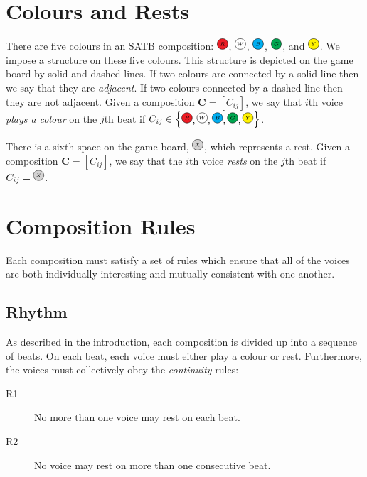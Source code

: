 \documentclass{scrartcl}
\newcommand{\RRR}{
  \begin{tikzpicture}
    \node[circle, draw, fill=Red, inner sep= 0pt, text width=1em, align=center] (n) at (0,0) {$\scriptscriptstyle R$};
  \end{tikzpicture}
}
\newcommand{\WWW}{
  \begin{tikzpicture}
    \node[circle, draw, fill=White,  inner sep= 0pt, text width=1em, align=center] (n) at (0,0) {$\scriptscriptstyle W$};
  \end{tikzpicture}
}
\newcommand{\BBB}{
  \begin{tikzpicture}
    \node[circle, draw, fill=Cyan,  inner sep= 0pt, text width=1em, align=center] (n) at (0,0) {$\scriptscriptstyle B$};
  \end{tikzpicture}
}
\newcommand{\GGG}{
  \begin{tikzpicture}
    \node[circle, draw, fill=Green,  inner sep= 0pt, text width=1em, align=center] (n) at (0,0) {$\scriptscriptstyle G$};
  \end{tikzpicture}
}
\newcommand{\YYY}{
  \begin{tikzpicture}
    \node[circle, draw, fill=Yellow,  inner sep= 0pt, text width=1em, align=center] (n) at (0,0) {$\scriptscriptstyle Y$};
  \end{tikzpicture}
}
\newcommand{\XXX}{
  \begin{tikzpicture}
    \node[circle, draw, fill=Gray!40,  inner sep= 0pt, text width=1em, align=center] (n) at (0,0) {$\scriptscriptstyle X$};
  \end{tikzpicture}
}
\numberwithin{example}{section}
\begin{document}
\section{Colours and Rests}
There are five colours in an SATB composition:
$\RRR$, $\WWW$, $\BBB$, $\GGG$, and $\YYY$.
We impose a structure on these five colours. This structure is depicted on the game
board by solid and dashed lines. 
If two colours are connected by a solid line then we say that they are \emph{adjacent}.
If two colours connected by a dashed line then they are not adjacent.
Given a composition $\mathbf{C} = [C_{ij}]$, we say that $i$th voice
\emph{plays a colour} on the $j$th beat if
$C_{ij} \in \begin{Bmatrix}\RRR, \WWW, \BBB, \GGG, \YYY\end{Bmatrix}$.

There is a sixth space on the game board, $\XXX$, which represents a rest.
Given a composition $\mathbf{C} = [C_{ij}]$,
we say that the $i$th voice \emph{rests} on the $j$th beat if $C_{ij} = \XXX$.


\section{Composition Rules}\label{section:composition_rules}
Each composition must satisfy a set of rules which ensure that all of the voices are
both individually interesting and mutually consistent with one another.
 
\subsection{Rhythm}
As described in the introduction, each composition is divided up into a sequence of beats. On each beat, each voice must either play a colour or rest.
Furthermore, the voices must collectively obey the \emph{continuity} rules:
\begin{description}
	\item[R1] No more than one voice may rest on each beat.
	\item[R2] No voice may rest on more than one consecutive beat.
\end{description}
\end{document}
